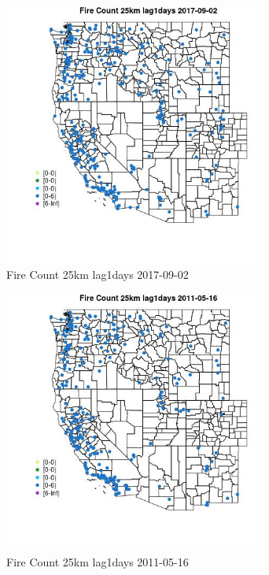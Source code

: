 \begin{figure} 
\centering  
\includegraphics[width=0.77\textwidth]{Code_Outputs/Report_ML_input_PM25_Step4_part_e_de_duplicated_aves_compiled_2019-05-21wNAs_MapObsFire_Count_25km_lag1days2017-09-02.jpg} 
\caption{\label{fig:Report_ML_input_PM25_Step4_part_e_de_duplicated_aves_compiled_2019-05-21wNAsMapObsFire_Count_25km_lag1days2017-09-02}Fire Count 25km lag1days 2017-09-02} 
\end{figure} 
 

\begin{figure} 
\centering  
\includegraphics[width=0.77\textwidth]{Code_Outputs/Report_ML_input_PM25_Step4_part_e_de_duplicated_aves_compiled_2019-05-21wNAs_MapObsFire_Count_25km_lag1days2011-05-16.jpg} 
\caption{\label{fig:Report_ML_input_PM25_Step4_part_e_de_duplicated_aves_compiled_2019-05-21wNAsMapObsFire_Count_25km_lag1days2011-05-16}Fire Count 25km lag1days 2011-05-16} 
\end{figure} 
 

